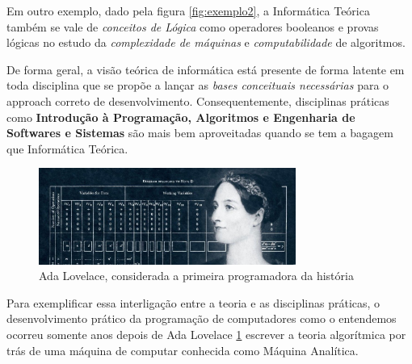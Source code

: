 \documentclass{article}
\begin{document}
Em outro exemplo, dado pela figura \ref{fig:exemplo2}, a Informática Teórica também se vale de \textit{conceitos de Lógica} como operadores booleanos e provas lógicas no estudo da \textit{complexidade de máquinas} e \textit{computabilidade} de algoritmos. 
\cite{complexity}

De forma geral, a visão teórica de informática está presente de forma latente em toda disciplina que se propõe a lançar as \textit{bases conceituais necessárias} para o approach correto de desenvolvimento. Consequentemente, disciplinas práticas como \textbf{Introdução à Programação, Algoritmos e Engenharia de Softwares e Sistemas} são mais bem aproveitadas quando se tem a bagagem que Informática Teórica. 

\begin{figure}[ht]
    \centering
    \includegraphics[width=0.75\textwidth]{adalov}
    \caption{Ada Lovelace, considerada a primeira programadora da história}
    \label{fig:ada}
\end{figure}

 Para exemplificar essa interligação entre a teoria e as disciplinas práticas, o desenvolvimento prático da programação de computadores como o entendemos ocorreu somente anos depois de Ada Lovelace \ref{fig:ada} escrever a teoria algorítmica por trás de uma máquina de computar conhecida como Máquina Analítica.\cite{adalovelace}

\printbibliography[
heading=bibintoc,
title={Referências}
]
\end{document}
